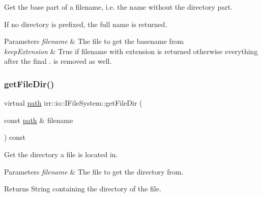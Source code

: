 Get the base part of a filename, i.\+e. the name without the directory part. 

If no directory is prefixed, the full name is returned. 
\begin{DoxyParams}{Parameters}
{\em filename} & The file to get the basename from \\
\hline
{\em keep\+Extension} & True if filename with extension is returned otherwise everything after the final \textquotesingle{}.\textquotesingle{} is removed as well. \\
\hline
\end{DoxyParams}
\mbox{\label{classirr_1_1io_1_1IFileSystem_ad8b7b93f32f58c1ba9a8e7cacd5de80b}} 
\subsubsection{\texorpdfstring{get\+File\+Dir()}{getFileDir()}\hspace{0.1cm}{\footnotesize\ttfamily [1/2]}}
{\footnotesize\ttfamily virtual \hyperlink{namespaceirr_1_1io_a6468281622ce3a1c46b72e19f32dded5}{path} irr\+::io\+::\+I\+File\+System\+::get\+File\+Dir (\begin{DoxyParamCaption}\item[{const \hyperlink{namespaceirr_1_1io_a6468281622ce3a1c46b72e19f32dded5}{path} \&}]{filename }\end{DoxyParamCaption}) const\hspace{0.3cm}{\ttfamily [pure virtual]}}



Get the directory a file is located in. 


\begin{DoxyParams}{Parameters}
{\em filename} & The file to get the directory from. \\
\hline
\end{DoxyParams}
\begin{DoxyReturn}{Returns}
String containing the directory of the file. 
\end{DoxyReturn}
\mbox{\label{classirr_1_1io_1_1IFileSystem_ad8b7b93f32f58c1ba9a8e7cacd5de80b}} 
